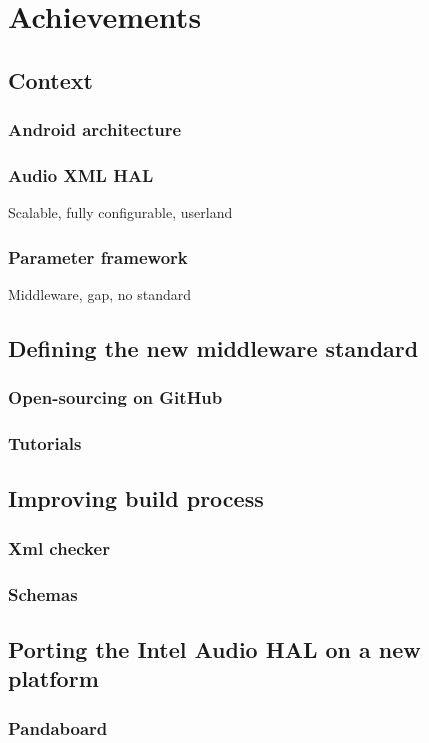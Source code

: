 \chapter{Achievements}

\section{Context}

\subsection{Android architecture}

\subsection{Audio XML HAL}
Scalable, fully configurable, userland

\subsection{Parameter framework}
Middleware, gap, no standard

\section{Defining the new middleware standard}
\subsection{Open-sourcing on GitHub}
\subsection{Tutorials}

\section{Improving build process}
\subsection{Xml checker}
\subsection{Schemas}

\section{Porting the Intel Audio HAL on a new platform}
\subsection{Pandaboard}
